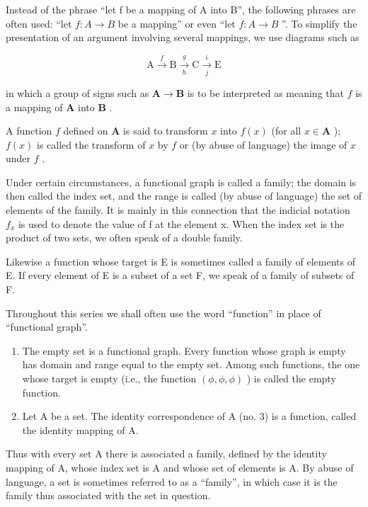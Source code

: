 Instead of the phrase ``let f be a mapping of A into B'', the following phrases are often used: ``let \(f: A \rightarrow B\) be a mapping'' or even ``let \(f: A \rightarrow B\) ''. To simplify the presentation of an argument involving several mappings, we use diagrams such as

\[
\mathrm{A} \xrightarrow {f} \mathrm{B} \xrightarrow [ h ]{g} \mathrm{C} \xrightarrow [ j ]{i} \mathrm{E}
\]

in which a group of signs such as \(\mathbf{A} \to \mathbf{B}\) is to be interpreted as meaning that \(f\) is a mapping of \(\mathbf{A}\) into \(\mathbf{B}\) .

A function \(f\) defined on \(\mathbf{A}\) is said to transform \(x\) into \(f(x)\) (for all \(x \in \mathbf{A}\) ); \(f(x)\) is called the transform of \(x\) by \(f\) or (by abuse of language) the image of \(x\) under \(f\) .

Under certain circumstances, a functional graph is called a family; the domain is then called the index set, and the range is called (by abuse of language) the set of elements of the family. It is mainly in this connection that the indicial notation \(f_{x}\) is used to denote the value of f at the element x. When the index set is the product of two sets, we often speak of a double family.

Likewise a function whose target is E is sometimes called a family of elements of E. If every element of E is a subset of a set F, we speak of a family of subsets of F.

Throughout this series we shall often use the word ``function'' in place of ``functional graph''.


\begin{enumerate}
\def\labelenumi{(\arabic{enumi})}
\item
  The empty set is a functional graph. Every function whose graph is empty has domain and range equal to the empty set. Among such functions, the one whose target is empty (i.e., the function \((\phi, \phi, \phi)\) ) is called the empty function.
\item
  Let A be a set. The identity correspondence of A (no. 3) is a function, called the identity mapping of A.
\end{enumerate}

Thus with every set A there is associated a family, defined by the identity mapping of A, whose index set is A and whose set of elements is A. By abuse of language, a set is sometimes referred to as a ``family'', in which case it is the family thus associated with the set in question.

